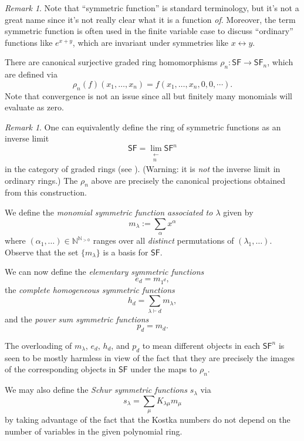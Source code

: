 \documentclass[12pt]{article}
\theoremstyle{plain}
\theoremstyle{definition}
\theoremstyle{remark}
\newtheorem{remark}[theorem]{Remark}
\numberwithin{equation}{section}
\begin{document}
\begin{remark}
Note that ``symmetric function'' is standard terminology,
but it's not a great name since it's not
really clear what it is a function \emph{of}.
Moreover, the term symmetric function is often used in the finite
variable case to discuss ``ordinary'' functions like $e^{x+y}$,
which are invariant under symmetries like $x \leftrightarrow y$.
\end{remark}

There are canonical surjective graded ring homomorphisms
$\rho_n : \mathsf{SF} \to \mathsf{SF}_n$, which are defined via
\[
\rho_n(f)(x_1,\ldots,x_n) = f(x_1,\ldots,x_n,0,0,\cdots) .
\]
Note that convergence is not an issue since all but finitely many monomials
will evaluate as zero.

\begin{remark}
One can equivalently define the ring of symmetric functions as an inverse
limit
\[
\mathsf{SF} = \lim_{\substack{\longleftarrow\\n}} \mathsf{SF}^n
\]
in the category of graded rings (see \cite{Macdonald}).
(Warning: it is \emph{not} the inverse limit in ordinary rings.)
The $\rho_n$ above are precisely the canonical projections obtained from
this construction.
\end{remark}

We define the \emph{monomial symmetric function associated to $\lambda$}
given by
\[
m_\lambda := \sum_{\alpha} x^\alpha
\]
where $(\alpha_1,\ldots) \in \mathbb{N}^{\mathbb{N}_{>0}}$ ranges over all
\emph{distinct} permutations of $(\lambda_1,\ldots)$.
Observe that the set $\{ m_\lambda\}$ is a basis for $\mathsf{SF}$.

We can now define the \emph{elementary symmetric functions}
\[
e_d = m_{1^d},
\]
the \emph{complete homogeneous symmetric functions}
\[
h_d = \sum_{\lambda \vdash d} m_\lambda ,
\]
and the \emph{power sum symmetric functions}
\[
p_d = m_{d}.
\]

The overloading of $m_\lambda$, $e_d$, $h_d$, and $p_d$ to mean
different objects in each $\mathsf{SF}^n$ is seen to be mostly harmless
in view of the fact that they are precisely the images of the
corresponding objects in $\mathsf{SF}$ under the maps to $\rho_n$.

We may also define the \emph{Schur symmetric functions}
$s_\lambda$ via 
\[
s_\lambda = \sum_{\mu} K_{\lambda \mu} m_\mu
\]
by taking advantage of the fact that the Kostka numbers
do not depend on the number of variables in the given polynomial ring.
\end{document}

